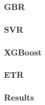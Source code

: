 
\subsubsection{GBR} %

\subsubsection{SVR}

\subsubsection{XGBoost}

\subsubsection{ETR}

\subsubsection{Results}
